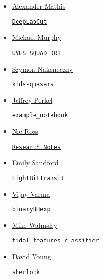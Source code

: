 \documentclass[11pt,a4paper]{article}
\begin{document}
\begin{itemize}
\item \href{https://github.com/AlexEMG}{Alexander Mathis}
  \begin{itemize}
    \href{https://github.com/AlexEMG/DeepLabCut}{\tt DeepLabCut} 
  \end{itemize}

\item \href{https://github.com/MTMurphy77/}{Michael Murphy}
  \begin{itemize}
    \href{https://github.com/MTMurphy77/UVES_SQUAD_DR1}{\tt UVES\_SQUAD\_DR1}
  \end{itemize}

  \item \href{https://github.com/snakoneczny}{Szymon Nakoneczny}
  \begin{itemize}
    \href{https://github.com/snakoneczny/kids-quasars}{\tt kids-quasars}
  \end{itemize}

\item \href{https://github.com/jperkel/}{Jeffrey Perkel}
  \begin{itemize}
    \href{https://github.com/jperkel/example_notebook}{\tt example\_notebook}
  \end{itemize}

\item \href{https://github.com/d80b2t}{Nic Ross}
  \begin{itemize}
    \href{https://github.com/d80b2t/Research\_Notes}{\tt Research\_Notes}
  \end{itemize}

\item \href{https://github.com/esandford}{Emily Sandford}
  \begin{itemize}
    \href{https://github.com/esandford/EightBitTransit}{\tt EightBitTransit}
  \end{itemize}

\item \href{https://github.com/vijayvarma392}{Vijay Varma}
  \begin{itemize}
    \href{https://github.com/vijayvarma392/binaryBHexp}{\tt binaryBHexp}
  \end{itemize}

\item \href{https://github.com/mwalmsley/}{Mike Walmsley} 
  \begin{itemize}
    \href{https://github.com/mwalmsley/tidal-features-classifier}{\tt tidal-features-classifier} 
\end{itemize}


\item \href{https://github.com/thespacedoctor}{David Young}
  \begin{itemize}
    \href{https://github.com/thespacedoctor/sherlock}{{\tt sherlock}}
  \end{itemize}




\end{itemize}
\end{document}
